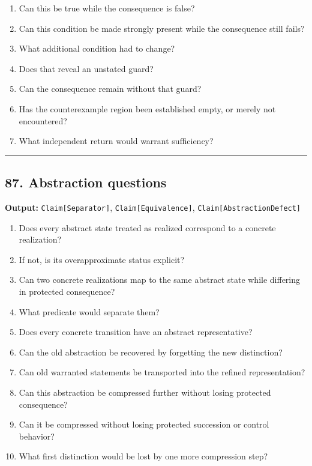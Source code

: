 \documentclass[
]{article}
\providecommand{\tightlist}{%
  \setlength{\itemsep}{0pt}\setlength{\parskip}{0pt}}
\begin{document}
\begin{enumerate}
\def\labelenumi{\arabic{enumi}.}
\tightlist
\item
  Can this be true while the consequence is false?
\item
  Can this condition be made strongly present while the consequence
  still fails?
\item
  What additional condition had to change?
\item
  Does that reveal an unstated guard?
\item
  Can the consequence remain without that guard?
\item
  Has the counterexample region been established empty, or merely not
  encountered?
\item
  What independent return would warrant sufficiency?
\end{enumerate}

\begin{center}\rule{0.5\linewidth}{0.5pt}\end{center}

\subsection{87. Abstraction questions}\label{abstraction-questions}

\textbf{Output:} \texttt{Claim{[}Separator{]}},
\texttt{Claim{[}Equivalence{]}}, \texttt{Claim{[}AbstractionDefect{]}}

\begin{enumerate}
\def\labelenumi{\arabic{enumi}.}
\tightlist
\item
  Does every abstract state treated as realized correspond to a concrete
  realization?
\item
  If not, is its overapproximate status explicit?
\item
  Can two concrete realizations map to the same abstract state while
  differing in protected consequence?
\item
  What predicate would separate them?
\item
  Does every concrete transition have an abstract representative?
\item
  Can the old abstraction be recovered by forgetting the new
  distinction?
\item
  Can old warranted statements be transported into the refined
  representation?
\item
  Can this abstraction be compressed further without losing protected
  consequence?
\item
  Can it be compressed without losing protected succession or control
  behavior?
\item
  What first distinction would be lost by one more compression step?
\end{enumerate}
\end{document}
